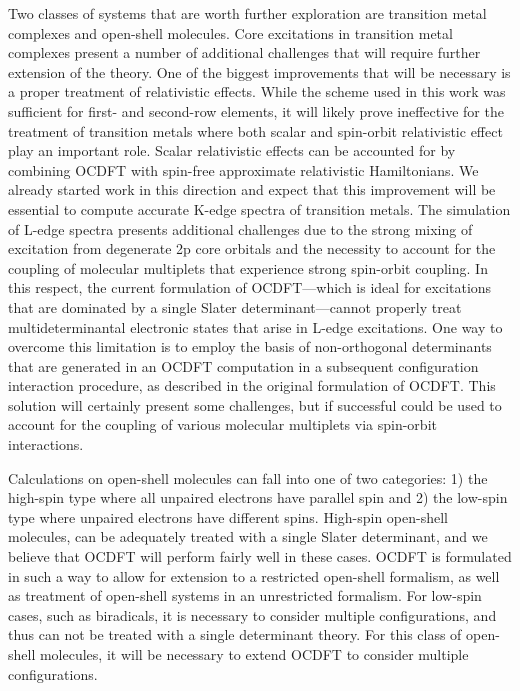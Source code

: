 \documentclass[12pt]{article}
\begin{document}
\begin{mdframed}[hidealllines=true,backgroundcolor=blue!20]
Two classes of systems that are worth further exploration are transition metal complexes and open-shell molecules. Core excitations in transition metal complexes present a number of additional challenges that will require further extension of the theory.
One of the biggest improvements that will be necessary is a proper treatment of relativistic effects.
While the scheme used in this work was sufficient for first- and second-row elements, it will likely prove ineffective for the treatment of transition metals where both scalar and spin-orbit relativistic effect play an important role.
Scalar relativistic effects can be accounted for by combining OCDFT with spin-free approximate relativistic Hamiltonians.
We already started work in this direction and expect that this improvement will be essential to compute accurate K-edge spectra of transition metals.
The simulation of L-edge spectra presents additional challenges due to the strong mixing of excitation from degenerate 2p core orbitals and the necessity to account for the coupling of molecular multiplets that experience strong spin-orbit coupling.
In this respect, the current formulation of OCDFT---which is ideal for excitations that are dominated by a single Slater determinant---cannot properly treat multideterminantal electronic states that arise in L-edge excitations.
One way to overcome this limitation is to employ the basis of non-orthogonal determinants that are generated in an OCDFT computation in a subsequent configuration interaction procedure, as described in the original formulation of OCDFT.\cite{evangelista_orthogonality_2013}
This solution will certainly present some challenges, but if successful could be used to account for the coupling of various molecular multiplets via spin-orbit interactions.

Calculations on open-shell molecules can fall into one of two categories: 1) the high-spin type where all unpaired electrons have parallel spin and 2) the low-spin type where unpaired electrons have different spins. High-spin open-shell molecules, can be adequately treated with a single Slater determinant, and we believe that OCDFT will perform fairly well in these cases. OCDFT is formulated in such a way to allow for extension to a restricted open-shell formalism, as well as treatment of open-shell systems in an unrestricted formalism. For low-spin cases, such as biradicals, it is necessary to consider multiple configurations, and thus can not be treated with a single determinant theory. For this class of open-shell molecules, it will be necessary to extend OCDFT to consider multiple configurations. 


\end{mdframed}
\end{document}
